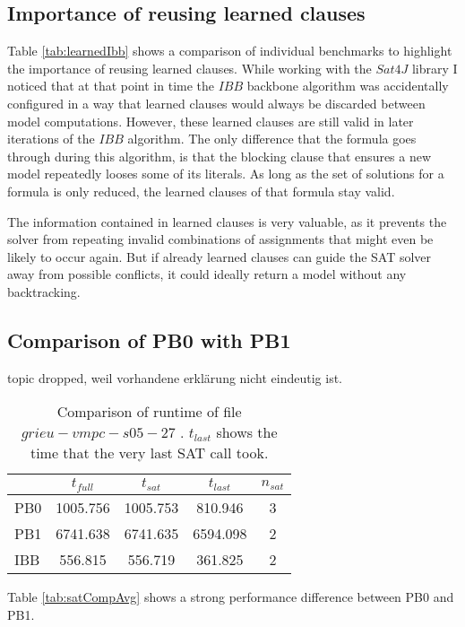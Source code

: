 \subsection{Importance of reusing learned clauses}
Table \ref{tab:learnedIbb} shows a comparison of individual benchmarks to highlight the importance of reusing learned clauses. While working with the $Sat4J$ library I noticed that at that point in time the $IBB$ backbone algorithm was accidentally configured in a way that learned clauses would always be discarded between model computations. However, these learned clauses are still valid in later iterations of the $IBB$ algorithm. The only difference that the formula goes through during this algorithm, is that the blocking clause that ensures a new model repeatedly looses some of its literals. As long as the set of solutions for a formula is only reduced, the learned clauses of that formula stay valid.

The information contained in learned clauses is very valuable, as it prevents the solver from repeating invalid combinations of assignments that might even be likely to occur again. But if already learned clauses can guide the SAT solver away from possible conflicts, it could ideally return a model without any backtracking.

\iffalse 
\subsection{Comparison of PB0 with PB1}
topic dropped, weil vorhandene erklärung nicht eindeutig ist.

\begin{wraptable}[7]{r}{7cm} %
\begin{tabular}{l| c c c c}
& $t_{full}$ & $t_{sat}$ & $t_{last}$ & $n_{sat}$ \\
\hline			
PB0 & 1005.756 & 1005.753 & 810.946 & 3 \\
PB1 & 6741.638 & 6741.635 & 6594.098 & 2 \\
IBB & 556.815 & 556.719 & 361.825 & 2 \\
\end{tabular}
\caption{Comparison of runtime of file $grieu-vmpc-s05-27$ . $t_{last}$ shows the time that the very last SAT call took.}
\label{tab:tLastGrieu} %
\end{wraptable}
Table \ref{tab:satCompAvg} shows a strong performance difference between PB0 and PB1.

